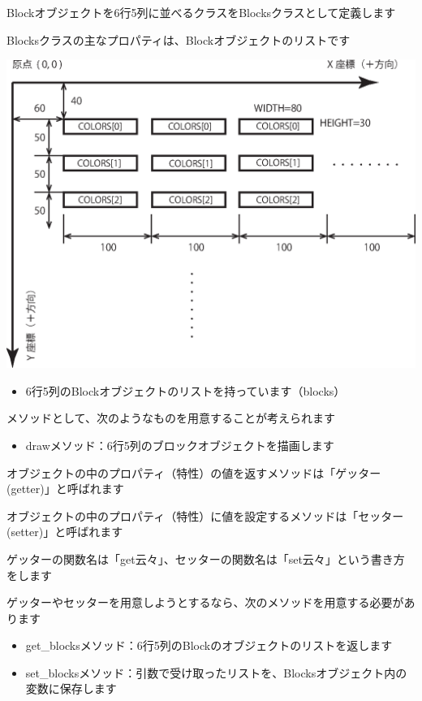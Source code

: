 \documentclass[uplatex,a4paper,11pt,oneside,openany]{jsbook}
\begin{document}
Blockオブジェクトを6行5列に並べるクラスをBlocksクラスとして定義します

Blocksクラスの主なプロパティは、Blockオブジェクトのリストです

\begin{center}
  \includegraphics[width=0.6\hsize]{figures/eps/blocks.eps}
\end{center}

\begin{itemize}
  \item 6行5列のBlockオブジェクトのリストを持っています（blocks）
\end{itemize}

メソッドとして、次のようなものを用意することが考えられます

\begin{itemize}
  \item drawメソッド：6行5列のブロックオブジェクトを描画します
\end{itemize}

オブジェクトの中のプロパティ（特性）の値を返すメソッドは「ゲッター(getter)」と呼ばれます

オブジェクトの中のプロパティ（特性）に値を設定するメソッドは「セッター(setter)」と呼ばれます

ゲッターの関数名は「get云々」、セッターの関数名は「set云々」という書き方をします

ゲッターやセッターを用意しようとするなら、次のメソッドを用意する必要があります

\begin{itemize}
  \item get\_blocksメソッド：6行5列のBlockのオブジェクトのリストを返します
  \item set\_blocksメソッド：引数で受け取ったリストを、Blocksオブジェクト内の変数に保存します
\end{itemize}
\end{document}
